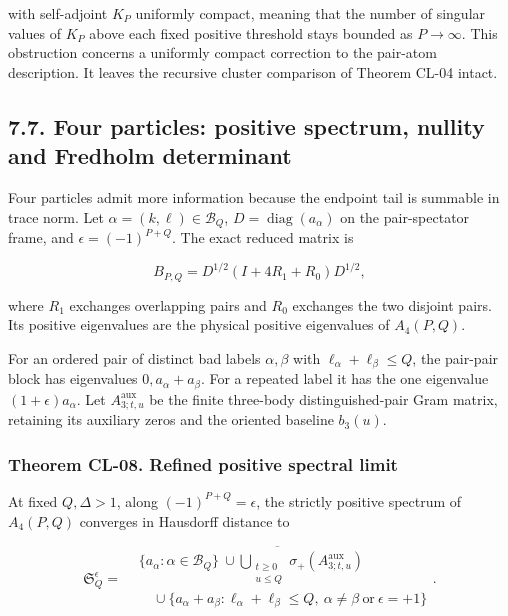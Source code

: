 with self-adjoint \(K_P\) uniformly compact, meaning that the number of singular values of \(K_P\) above each fixed positive threshold stays bounded as \(P\to\infty\). This obstruction concerns a uniformly compact correction to the pair-atom description. It leaves the recursive cluster comparison of Theorem CL-04 intact.

\hypertarget{four-particles-positive-spectrum-nullity-and-fredholm-determinant}{%
\subsection{7.7. Four particles: positive spectrum, nullity and Fredholm determinant}\label{four-particles-positive-spectrum-nullity-and-fredholm-determinant}}

Four particles admit more information because the endpoint tail is summable in trace norm. Let \(\alpha=(k,\ell)\in\mathcal B_Q\), \(D=\operatorname{diag}(a_\alpha)\) on the pair-spectator frame, and \(\epsilon=(-1)^{P+Q}\). The exact reduced matrix is

\[
B_{P,Q}=D^{1/2}(I+4R_1+R_0)D^{1/2},
\tag{CL.23}
\]

where \(R_1\) exchanges overlapping pairs and \(R_0\) exchanges the two disjoint pairs. Its positive eigenvalues are the physical positive eigenvalues of \(A_4(P,Q)\).

For an ordered pair of distinct bad labels \(\alpha,\beta\) with \(\ell_\alpha+\ell_\beta\leq Q\), the pair-pair block has eigenvalues \(0,a_\alpha+a_\beta\). For a repeated label it has the one eigenvalue \((1+\epsilon)a_\alpha\). Let \(A_{3;t,u}^{\mathrm{aux}}\) be the finite three-body distinguished-pair Gram matrix, retaining its auxiliary zeros and the oriented baseline \(b_3(u)\).

\hypertarget{theorem-cl-08.-refined-positive-spectral-limit}{%
\subsubsection{Theorem CL-08. Refined positive spectral limit}\label{theorem-cl-08.-refined-positive-spectral-limit}}

At fixed \(Q,\Delta>1\), along \((-1)^{P+Q}=\epsilon\), the strictly positive spectrum of \(A_4(P,Q)\) converges in Hausdorff distance to

\[
\mathfrak S_Q^\epsilon=
\overline{\begin{aligned}
&\{a_\alpha:\alpha\in\mathcal B_Q\}
\ \cup\!\bigcup_{\substack{t\geq0\\u\leq Q}}
\sigma_+(A_{3;t,u}^{\mathrm{aux}})\\
&\quad\cup\{a_\alpha+a_\beta:
\ell_\alpha+\ell_\beta\leq Q,
\ \alpha\ne\beta\ \text{or}\ \epsilon=+1\}
\end{aligned}}.
\tag{CL.24}
\]

